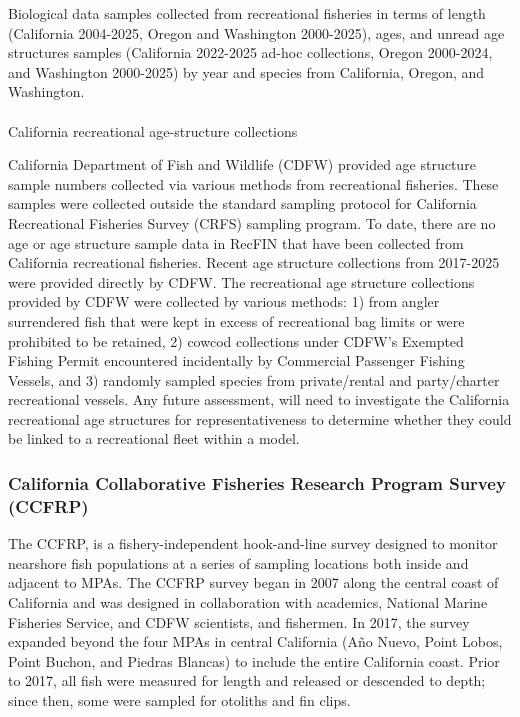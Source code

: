 \documentclass[
  english,
]{article}
\makeatletter
\let\oldparagraph\paragraph
\renewcommand{\paragraph}{
    \@ifstar
      \xxxParagraphStar
      \xxxParagraphNoStar
  }
\newcommand{\xxxParagraphStar}[1]{\oldparagraph*{#1}\mbox{}}
\newcommand{\xxxParagraphNoStar}[1]{\oldparagraph{#1}\mbox{}}
\makeatother
\begin{document}
Biological data samples collected from recreational fisheries in terms
of length (California 2004-2025, Oregon and Washington 2000-2025), ages,
and unread age structures samples (California 2022-2025 ad-hoc
collections, Oregon 2000-2024, and Washington 2000-2025) by year and
species from California, Oregon, and Washington.

\paragraph{California recreational age-structure
collections}\label{california-recreational-age-structure-collections}

California Department of Fish and Wildlife (CDFW) provided age structure
sample numbers collected via various methods from recreational
fisheries. These samples were collected outside the standard sampling
protocol for California Recreational Fisheries Survey (CRFS) sampling
program. To date, there are no age or age structure sample data in
RecFIN that have been collected from California recreational fisheries.
Recent age structure collections from 2017-2025 were provided directly
by CDFW. The recreational age structure collections provided by CDFW
were collected by various methods: 1) from angler surrendered fish that
were kept in excess of recreational bag limits or were prohibited to be
retained, 2) cowcod collections under CDFW's Exempted Fishing Permit
encountered incidentally by Commercial Passenger Fishing Vessels, and 3)
randomly sampled species from private/rental and party/charter
recreational vessels. Any future assessment, will need to investigate
the California recreational age structures for representativeness to
determine whether they could be linked to a recreational fleet within a
model.

\subsubsection{California Collaborative Fisheries Research Program
Survey
(CCFRP)}\label{california-collaborative-fisheries-research-program-survey-ccfrp}

The CCFRP, is a fishery-independent hook-and-line survey designed to
monitor nearshore fish populations at a series of sampling locations
both inside and adjacent to MPAs. The CCFRP survey began in 2007 along
the central coast of California and was designed in collaboration with
academics, National Marine Fisheries Service, and CDFW scientists, and
fishermen. In 2017, the survey expanded beyond the four MPAs in central
California (Año Nuevo, Point Lobos, Point Buchon, and Piedras Blancas)
to include the entire California coast. Prior to 2017, all fish were
measured for length and released or descended to depth; since then, some
were sampled for otoliths and fin clips.
\end{document}
